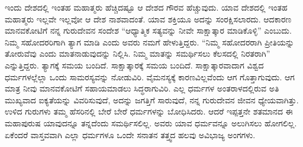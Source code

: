 ಇಂದು ದೇಶದಲ್ಲಿ ಇಂತಹ ಮಹಾತ್ಮರು ಹೆಚ್ಚಿದಷ್ಟೂ ಆ ದೇಶದ ಗೌರವ ಹೆಚ್ಚುವುದು. ಯಾವ ದೇಶದಲ್ಲಿ ಇಂತಹ ಮಹಾತ್ಮರು ಇಲ್ಲವೇ ಇಲ್ಲವೋ ಆ ದೇಶ ನಾಶವಾದಂತೆ. ಯಾವ ಶಕ್ತಿಯೂ ಅದನ್ನು ಸಂರಕ್ಷಿಸಲಾರದು. ಆದಕಾರಣ ಮಾನವಕೋಟಿಗೆ ನನ್ನ ಗುರುದೇವನ ಸಂದೇಶ “ಆಧ್ಯಾತ್ಮಿಕ ಸತ್ಯವನ್ನು ನೀವೇ ಸಾಕ್ಷಾತ್ಕಾರ ಮಾಡಿಕೊಳ್ಳಿ” ಎಂಬುದು. ನಿಮ್ಮ ಸಹೋದರರಿಗಾಗಿ ತ್ಯಾಗ ಮಾಡಿ ಎಂದು ಅವರು ನಮಗೆ ಹೇಳುತ್ತಿದ್ದರು. “ನಿಮ್ಮ ಸಹೋದರರಾಗಿ ಪ್ರೀತಿಯನ್ನು ತೋರುವೆವು ಎಂದು ಮಾತನಾಡುವುದನ್ನು ನಿಲ್ಲಿಸಿ. ನಿಮ್ಮ ಮಾತನ್ನು ಸಮರ್ಥಿಸಲು ಕೆಲಸದಲ್ಲಿ ನಿರತರಾಗಿ” ಎನ್ನುತ್ತಿದ್ದರು. ತ್ಯಾಗಕ್ಕೆ ಸಮಯ ಬಂದಿದೆ. ಸಾಕ್ಷಾತ್ಕಾರಕ್ಕೆ ಸಮಯ ಬಂದಿದೆ. ಸಾಕ್ಷಾತ್ಕಾರವಾದಾಗ ವಿಶ್ವದ ಧರ್ಮಗಳಲ್ಲೆಲ್ಲಾ ಒಂದು ಸಾಮರಸ್ಯವನ್ನು ನೋಡುವಿರಿ. ವೈಮನಸ್ಯಕ್ಕೆ ಕಾರಣವಿಲ್ಲವೆಂದು ಆಗ ಗೊತ್ತಾಗುವುದು. ಆಗ ಮಾತ್ರ ನೀವು ಮಾನವಕೋಟಿಗೆ ಸಹಾಯಮಾಡಲು ಸಿದ್ಧರಾಗುವಿರಿ. ಎಲ್ಲ ಧರ್ಮಗಳ ಅಂತರಾಳದಲ್ಲಿರುವ ಅತಿ ಮುಖ್ಯವಾದ ಐಕ್ಯತೆಯನ್ನು ವಿವರಿಸುವುದೆ, ಅದನ್ನು ಜಗತ್ತಿಗೆ ಸಾರುವುದೆ, ನನ್ನ ಗುರುದೇವನ ಜೀವನ ಧ್ಯೇಯವಾಗಿತ್ತು. ಉಳಿದ ಗುರುಗಳು ತಮ್ಮ ಹೆಸರಿನಲ್ಲಿ ಬೇರೆ ಬೇರೆ ಧರ್ಮಗಳನ್ನು ಬೋಧಿಸಿದರು. ಆದರೆ ಇಪ್ಪತ್ತನೇ ಶತಮಾನದ ಈ ಮಹಾಪುರುಷ ಯಾವುದನ್ನೂ ತನ್ನದೆಂದು ಸಮರ್ಥಿಸಲಿಲ್ಲ. ಅವರು ಯಾವ ಧರ್ಮವನ್ನೂ ಅಲುಗಿಸಲು ಹೋಗಲಿಲ್ಲ. ಏಕೆಂದರೆ ವಾಸ್ತವವಾಗಿ ಎಲ್ಲಾ ಧರ್ಮಗಳೂ ಒಂದೇ ಸನಾತನ ತತ್ತ್ವದ ಹಲವು ಅವಿಭಾಜ್ಯ ಅಂಗಗಳು.


